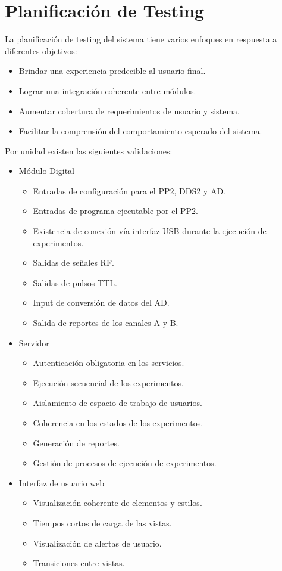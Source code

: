 \section{Planificaci\'on de Testing}

La planificaci\'on de testing del sistema tiene varios enfoques en respuesta a diferentes objetivos:
\begin{itemize}
    \item Brindar una experiencia predecible al usuario final.
    \item Lograr una integraci\'on coherente entre m\'odulos.
    \item Aumentar cobertura de requerimientos de usuario y sistema.
    \item Facilitar la comprensi\'on del comportamiento esperado del sistema.
\end{itemize}
Por unidad existen las siguientes validaciones:
\begin{itemize}
    \item M\'odulo Digital
    \begin{itemize}
        \item Entradas de configuraci\'on para el PP2, DDS2 y AD.
        \item Entradas de programa ejecutable por el PP2.
        \item Existencia de conexi\'on v\'ia interfaz USB durante la ejecuci\'on de experimentos.
        \item Salidas de se\~nales RF.
        \item Salidas de pulsos TTL.
        \item Input de conversi\'on de datos del AD.
        \item Salida de reportes de los canales A y B.
    \end{itemize}
    \item Servidor
    \begin{itemize}
        \item Autenticaci\'on obligatoria en los servicios.
        \item Ejecuci\'on secuencial de los experimentos.
        \item Aislamiento de espacio de trabajo de usuarios.
        \item Coherencia en los estados de los experimentos.
        \item Generaci\'on de reportes.
        \item Gesti\'on de procesos de ejecuci\'on de experimentos.
    \end{itemize}
    \item Interfaz de usuario web
    \begin{itemize}
        \item Visualizaci\'on coherente de elementos y estilos.
        \item Tiempos cortos de carga de las vistas.
        \item Visualizaci\'on de alertas de usuario.
        \item Transiciones entre vistas.
    \end{itemize}
\end{itemize}
